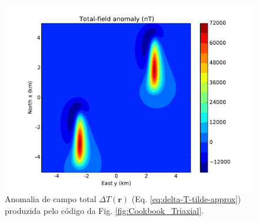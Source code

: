 \begin{figure}[hbt!]
	\centering \includegraphics[width=16 cm,height=12 cm]{figures/anomaly_exemplo}
	\caption[Anomalia de campo total $\Delta T (\mathbf{r})$ (Eq. \ref{eq:delta-T-tilde-approx}) produzida pelo código da Fig. \ref{fig:Cookbook_Triaxial}.]{Anomalia de campo total $\Delta T (\mathbf{r})$ (Eq. \ref{eq:delta-T-tilde-approx}) produzida pelo código da Fig. \ref{fig:Cookbook_Triaxial}.}
	\label{fig:anomaly_exemplo}
\end{figure}


